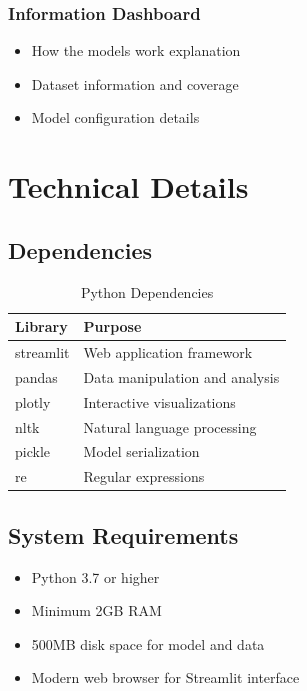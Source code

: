 \documentclass[12pt,a4paper]{report}
\begin{document}
\subsection{Information Dashboard}
\begin{itemize}
    \item How the models work explanation
    \item Dataset information and coverage
    \item Model configuration details
\end{itemize}

\chapter{Technical Details}

\section{Dependencies}

\begin{table}[H]
\centering
\begin{tabular}{|l|p{6cm}|}
\hline
\textbf{Library} & \textbf{Purpose} \\
\hline
streamlit & Web application framework \\
pandas & Data manipulation and analysis \\
plotly & Interactive visualizations \\
nltk & Natural language processing \\
pickle & Model serialization \\
re & Regular expressions \\
\hline
\end{tabular}
\caption{Python Dependencies}
\end{table}

\section{System Requirements}

\begin{itemize}
    \item Python 3.7 or higher
    \item Minimum 2GB RAM
    \item 500MB disk space for model and data
    \item Modern web browser for Streamlit interface
\end{itemize}
\end{document}
